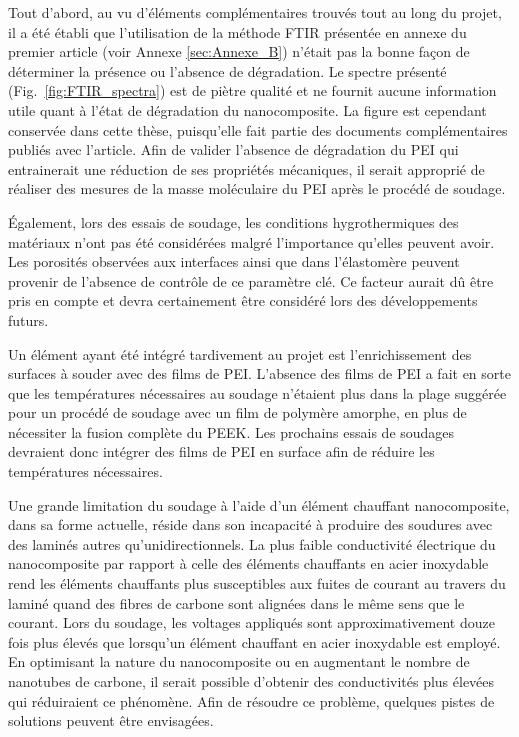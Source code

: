 Tout d'abord, au vu d'éléments complémentaires trouvés tout au long du projet, il a été établi que l'utilisation de la méthode FTIR présentée en annexe du premier article (voir Annexe \ref{sec:Annexe_B}) n'était pas la bonne façon de déterminer la présence ou l'absence de dégradation. 
Le spectre présenté (Fig.~\ref{fig:FTIR_spectra}) est de piètre qualité et ne fournit aucune information utile quant à l'état de dégradation du nanocomposite. 
La figure est cependant conservée dans cette thèse, puisqu'elle fait partie des documents complémentaires publiés avec l'article. 
Afin de valider l'absence de dégradation du PEI qui entrainerait une réduction de ses propriétés mécaniques, il serait approprié de réaliser des mesures de la masse moléculaire du PEI après le procédé de soudage. 

Également, lors des essais de soudage, les conditions hygrothermiques des matériaux n'ont pas été considérées malgré l'importance qu'elles peuvent avoir. 
Les porosités observées aux interfaces ainsi que dans l'élastomère peuvent provenir de l'absence de contrôle de ce paramètre clé. 
Ce facteur aurait dû être pris en compte et devra certainement être considéré lors des développements futurs. 

Un élément ayant été intégré tardivement au projet est l'enrichissement des surfaces à souder avec des films de PEI. 
L'absence des films de PEI a fait en sorte que les températures nécessaires au soudage n'étaient plus dans la plage suggérée pour un procédé de soudage avec un film de polymère amorphe, en plus de nécessiter la fusion complète du PEEK. 
Les prochains essais de soudages devraient donc intégrer des films de PEI en surface afin de réduire les températures nécessaires.  

Une grande limitation du soudage à l'aide d'un élément chauffant nanocomposite, dans sa forme actuelle, réside dans son incapacité à produire des soudures avec des laminés autres qu'unidirectionnels. 
La plus faible conductivité électrique du nanocomposite par rapport à celle des éléments chauffants en acier inoxydable rend les éléments chauffants plus susceptibles aux fuites de courant au travers du laminé quand des fibres de carbone sont alignées dans le même sens que le courant. 
Lors du soudage, les voltages appliqués sont approximativement douze fois plus élevés que lorsqu'un élément chauffant en acier inoxydable est employé. 
En optimisant la nature du nanocomposite ou en augmentant le nombre de nanotubes de carbone, il serait possible d'obtenir des conductivités plus élevées qui réduiraient ce phénomène. 
Afin de résoudre ce problème, quelques pistes de solutions peuvent être envisagées. 


